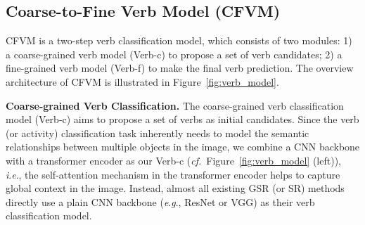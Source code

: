 \documentclass[letterpaper]{article} %
\newcommand{\ie}{\textit{i}.\textit{e}.}
\newcommand{\eg}{\textit{e}.\textit{g}.}
\newcommand{\cf}{\textit{cf.}}
\begin{document}



 
\subsection{Coarse-to-Fine Verb Model (CFVM)}

CFVM is a two-step verb classification model, which consists of two modules: 1) a coarse-grained verb model (Verb-c) to propose a set of verb candidates; 2) a fine-grained verb model (Verb-f) to make the final verb prediction. The overview architecture of CFVM is illustrated in Figure~\ref{fig:verb_model}.


\noindent\textbf{Coarse-grained Verb Classification.}
The coarse-grained verb classification model (Verb-c) aims to propose a set of verbs as initial candidates. Since the verb (or activity) classification task inherently needs to model the semantic relationships between multiple objects in the image, we combine a CNN backbone with a transformer encoder as our Verb-c (\cf~Figure~\ref{fig:verb_model} (left)), \ie, the self-attention mechanism in the transformer encoder helps to capture global context in the image. Instead, almost all existing GSR (or SR) methods directly use a plain CNN backbone (\eg, ResNet or VGG) as their verb classification model.
\end{document}
